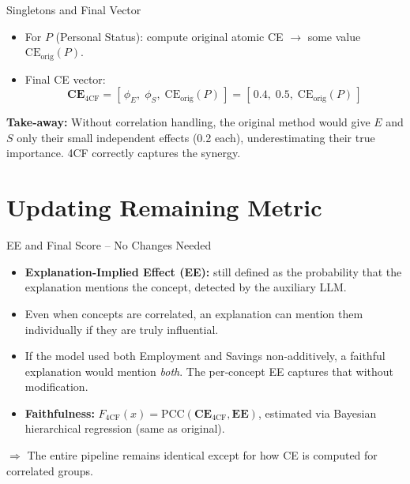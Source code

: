 \documentclass[aspectratio=169]{beamer}
\begin{document}
\begin{frame}{Singletons and Final Vector}
\begin{itemize}
  \item For $P$ (Personal Status): compute original atomic CE $\to$ some value $\mathrm{CE}_{\text{orig}}(P)$.
  \item Final CE vector:
        \[
        \mathbf{CE}_{\text{4CF}} = [\,\phi_E,\; \phi_S,\; \mathrm{CE}_{\text{orig}}(P)\,] = [\,0.4,\; 0.5,\; \mathrm{CE}_{\text{orig}}(P)\,]
        \]
\end{itemize}
\pause
\medskip
\textbf{Take‑away:} Without correlation handling, the original method would give $E$ and $S$ only their small independent effects (0.2 each), underestimating their true importance. 4CF correctly captures the synergy.
\end{frame}

\section{Updating Remaining Metric}
\begin{frame}{EE and Final Score – No Changes Needed}
\vspace*{-0.3cm}
\begin{itemize}
  \item \textbf{Explanation‑Implied Effect (EE):} still defined as the probability that the explanation mentions the concept, detected by the auxiliary LLM.
  \item Even when concepts are correlated, an explanation can mention them individually if they are truly influential.
  \item If the model used both Employment and Savings non‑additively, a faithful explanation would mention \emph{both}. The per‑concept EE captures that without modification.
  \item \textbf{Faithfulness:} $F_{\text{4CF}}(x) = \mathrm{PCC}(\mathbf{CE}_{\text{4CF}}, \mathbf{EE})$, estimated via Bayesian hierarchical regression (same as original).
\end{itemize}
\medskip
$\Rightarrow$ The entire pipeline remains identical except for how CE is computed for correlated groups.
\end{frame}
\end{document}
